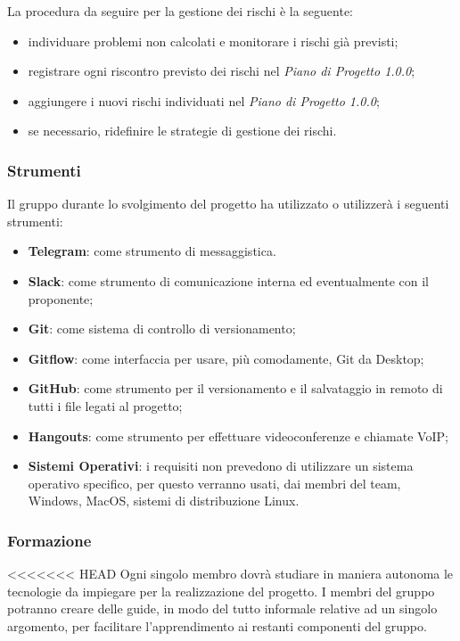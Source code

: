 \begin{itemize}
   				La procedura da seguire per la gestione dei rischi è la seguente:
   				\begin{itemize}
   					\item individuare problemi non calcolati e monitorare i rischi già previsti;
   					\item registrare ogni riscontro previsto dei rischi nel \textit{Piano di Progetto 1.0.0};
   					\item aggiungere i nuovi rischi individuati nel \textit{Piano di Progetto 1.0.0};
   					\item  se necessario, ridefinire le strategie di gestione dei rischi.
   				\end{itemize}
   		\subsubsection{Strumenti}
   			Il gruppo durante lo svolgimento del progetto ha utilizzato o utilizzerà i seguenti strumenti:
   			\begin{itemize}
   				\item \textbf{Telegram}: come strumento di messaggistica.
   				\item \textbf{Slack}: come strumento di comunicazione interna ed eventualmente con il proponente;
   				\item \textbf{Git}: come sistema di controllo di versionamento;
   				\item \textbf{Gitflow}: come interfaccia per usare, più comodamente, Git da Desktop;
   				\item \textbf{GitHub}: come strumento per il versionamento e il salvataggio in remoto di tutti i file legati al progetto;
   				\item \textbf{Hangouts}: come strumento per effettuare videoconferenze e chiamate VoIP;
   				\item \textbf{Sistemi Operativi}: i requisiti non prevedono di utilizzare un sistema operativo specifico, per questo verranno usati, dai membri del team, Windows, MacOS, sistemi di distribuzione Linux.
   			\end{itemize}
   		\subsubsection{Formazione}
<<<<<<< HEAD
   			Ogni singolo membro dovrà studiare in maniera autonoma le tecnologie da impiegare per la realizzazione del progetto. I membri del gruppo potranno creare delle guide, in modo del tutto informale relative ad un singolo argomento, per facilitare l'apprendimento ai restanti componenti del gruppo.
   			

\end{itemize}
